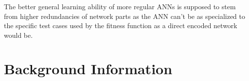 \documentclass[12pt,twoside]{article}
\theoremstyle{plain}
\theoremstyle{definition}
\theoremstyle{remark}
\begin{document}
The better general learning ability of more regular ANNs is supposed to stem from higher redundancies of network parts as the ANN can't be as specialized to the specific test cases used by the fitness function as a direct encoded network would be.


\section{Background Information}
\label{sec:background}

\end{document}
